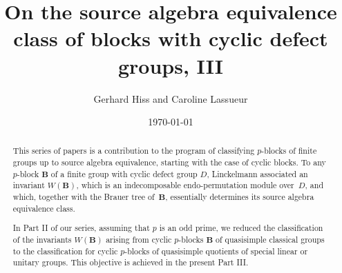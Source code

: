 \documentclass[12pt]{amsart}
\newcommand{\bB}{{\mathbf{B}}}
\theoremstyle{theorem}
\theoremstyle{definition}
\theoremstyle{remark}
\begin{document}




\title[On the source algebra equivalence class of blocks with cyclic defect groups, III]
{On the source algebra equivalence class of blocks with cyclic defect groups, III}

\date{\today}

\author{
Gerhard Hiss and  Caroline Lassueur
}
\address{{\sc Gerhard Hiss},  Lehrstuhl f\"ur Algebra und Zahlentheorie, 
RWTH Aachen, 52056 Aachen, Germany.}
\address{{\sc Caroline Lassueur}, Caroline Lassueur, 
RPTU Kaiserslautern-Land\-au, Fachbereich Mathematik,
67653 Kaiserslautern, Germany and Leibniz Universit\"at Hannover,
Institut f\"ur Algebra, Zahlentheorie und Diskrete Mathematik,
Welfengarten 1, 30167 Hannover, Germany.}



\begin{abstract} 
This series of papers is a contribution to the program of classifying
$p$-blocks of finite groups up to source algebra equivalence, starting
with the case of cyclic blocks.
To any $p$-block $\bB$ of a finite group with cyclic defect group $D$,
Linckelmann associated an invariant $W( \bB )$, which is an indecomposable
endo-permut\-ati\-on module over~$D$, and which, together with the Brauer tree
of~$\bB$, essentially determines its source algebra equivalence class.

In Part II of our series, assuming that $p$ is an odd prime, we reduced the 
classification of the invariants $W( \bB )$ arising from cyclic $p$-blocks $\bB$ of 
quasisimple classical groups to the classification for cyclic $p$-blocks 
of quasisimple quotients of special linear or unitary groups. This objective is 
achieved in the present Part III.
\end{abstract}



\maketitle
\end{document}
